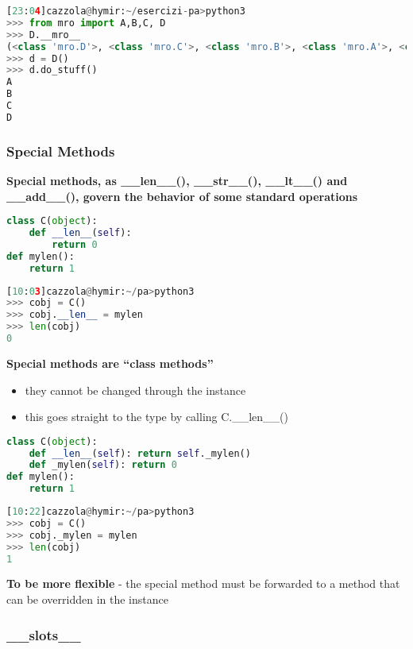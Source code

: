 \begin{lstlisting}[language=Python]
[23:04]cazzola@hymir:~/esercizi-pa>python3
>>> from mro import A,B,C, D
>>> D.__mro__
(<class 'mro.D'>, <class 'mro.C'>, <class 'mro.B'>, <class 'mro.A'>, <class 'object'>)
>>> d = D()
>>> d.do_stuff()
A
B
C
D
\end{lstlisting}

\subsubsection{Special Methods}

\textbf{Special methods, as \_\_len\_\_(), \_\_str\_\_(), \_\_lt\_\_() and \_\_add\_\_(),
govern the behavior of some standard operations}

\begin{lstlisting}[language=Python]
class C(object):
	def __len__(self):
		return 0
def mylen():
	return 1
\end{lstlisting}

\begin{lstlisting}[language=Python]
[10:03]cazzola@hymir:~/pa>python3
>>> cobj = C()
>>> cobj.__len__ = mylen
>>> len(cobj)
0
\end{lstlisting}

\textbf{Special methods are “class methods”}
\begin{itemize}
	\item they cannot be changed through the instance
	\item this goes straight to the type by calling C.\_\_len\_\_()
\end{itemize}

\begin{lstlisting}[language=Python]
class C(object):
	def __len__(self): return self._mylen()
	def _mylen(self): return 0
def mylen():
	return 1
\end{lstlisting}

\begin{lstlisting}[language=Python]
[10:22]cazzola@hymir:~/pa>python3
>>> cobj = C()
>>> cobj._mylen = mylen
>>> len(cobj)
1
\end{lstlisting}

\textbf{To be more flexible}
- the special method must be forwarded to a method that can be overridden in the instance

\subsubsection{\_\_slots\_\_}

